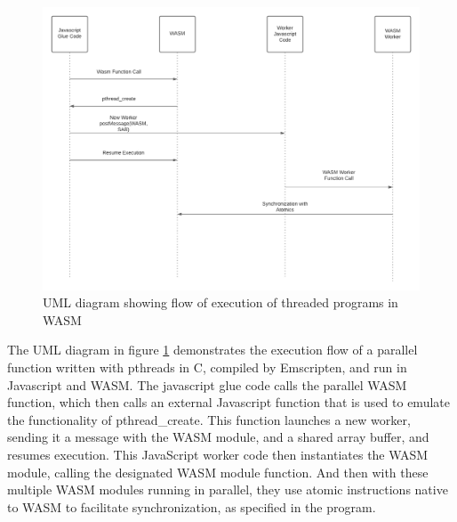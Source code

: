 \documentclass[11pt]{book}
\begin{document}
\begin{figure}[htb]
\centerline{\includegraphics[width=\textwidth]{figures/UML_threaded_wasm.png}}
\caption{UML diagram showing flow of execution of threaded programs in WASM}
\label{uml}
\end{figure}


The UML diagram in figure \ref{uml} demonstrates the execution flow of a parallel function written with pthreads in C, compiled by Emscripten, and run in Javascript and WASM. The javascript glue code calls the parallel WASM function, which then calls an external Javascript function that is used to emulate the functionality of pthread\_create. This function launches a new worker, sending it a message with the WASM module, and a shared array buffer, and resumes execution. This JavaScript worker code then  instantiates the WASM module, calling the designated WASM module function. And then with these multiple WASM modules running in parallel, they use atomic instructions native to WASM to facilitate synchronization, as specified in the program.



\end{document}
